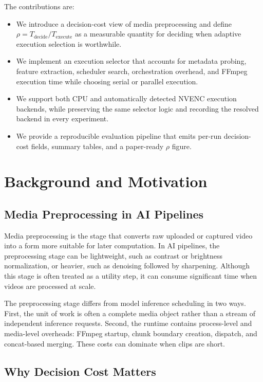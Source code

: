 \documentclass[conference]{IEEEtran}
\begin{document}
The contributions are:
\begin{itemize}
\item We introduce a decision-cost view of media preprocessing and define $\rho = T_{\mathrm{decide}} / T_{\mathrm{execute}}$ as a measurable quantity for deciding when adaptive execution selection is worthwhile.
\item We implement an execution selector that accounts for metadata probing, feature extraction, scheduler search, orchestration overhead, and FFmpeg execution time while choosing serial or parallel execution.
\item We support both CPU and automatically detected NVENC execution backends, while preserving the same selector logic and recording the resolved backend in every experiment.
\item We provide a reproducible evaluation pipeline that emits per-run decision-cost fields, summary tables, and a paper-ready $\rho$ figure.
\end{itemize}

\section{Background and Motivation}

\subsection{Media Preprocessing in AI Pipelines}

Media preprocessing is the stage that converts raw uploaded or captured video into a form more suitable for later computation.
In AI pipelines, the preprocessing stage can be lightweight, such as contrast or brightness normalization, or heavier, such as denoising followed by sharpening.
Although this stage is often treated as a utility step, it can consume significant time when videos are processed at scale.

The preprocessing stage differs from model inference scheduling in two ways.
First, the unit of work is often a complete media object rather than a stream of independent inference requests.
Second, the runtime contains process-level and media-level overheads: FFmpeg startup, chunk boundary creation, dispatch, and concat-based merging.
These costs can dominate when clips are short.

\subsection{Why Decision Cost Matters}
\end{document}
